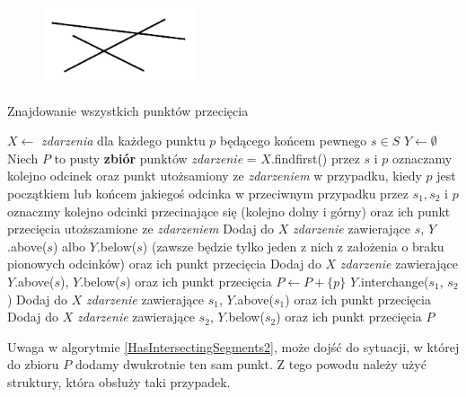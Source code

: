 \begin{figure}[H]
	\centering
	\includegraphics[width=0.4\textwidth]{data/zamiatanie_wariant2_kontrprzyklad.png}
	\caption{  }
	\label{fig:zamiatanie_kontrprzyklad_wariant2}
\end{figure}

\begin{algorithm}[H]
	\caption{Znajdowanie wszystkich punktów przecięcia}
	\begin{algorithmic}[1]
		\State $X \gets$ \textit{zdarzenia} dla każdego punktu $p$ będącego
		końcem pewnego $s \in S$
		\State $Y \gets \emptyset$
		\State Niech $P$ to pusty \textbf{zbiór} punktów
		\State \textit{zdarzenie} = $X.$findfirst()
		\State przez $s$ i $p$ oznaczamy
		kolejno odcinek oraz punkt utożsamiony ze \textit{zdarzeniem} w przypadku,
		kiedy $p$ jest początkiem lub końcem jakiegoś odcinka
		\State w przeciwnym przypadku przez $s_1, s_2$ i $p$ oznaczmy kolejno odcinki przecinające się (kolejno dolny i górny)
		oraz ich punkt przecięcia utoższamione ze \textit{zdarzeniem}
		\State Dodaj do $X$ \textit{zdarzenie} zawierające $s$, $Y$.above($s$)
		albo $Y$.below($s$) (zawsze będzie tylko jeden z nich z założenia o braku pionowych odcinków) oraz ich punkt przecięcia
		\EndIf
		\State Dodaj do $X$ \textit{zdarzenie} zawierające $Y$.above($s$), $Y$.below($s$) oraz ich punkt przecięcia  
		\EndIf
		\Else
		\State $P \gets P + \{p\}$
		\State $Y$.interchange($s_1$, $s_2$)
		\State Dodaj do $X$ \textit{zdarzenie} zawierające $s_1$, $Y$.above($s_1$) oraz ich punkt przecięcia
		\EndIf
		\State Dodaj do $X$ \textit{zdarzenie} zawierające $s_2$, $Y$.below($s_2$) oraz ich punkt przecięcia
		\EndIf
		\EndIf
		\EndWhile
		\State \Return $P$
		\EndProcedure
	\end{algorithmic}
	\label{HasIntersectingSegments2}
\end{algorithm}

Uwaga w algorytmie \ref{HasIntersectingSegments2}, może dojść do sytuacji, w której
do zbioru $P$ dodamy dwukrotnie ten sam punkt. Z tego powodu należy użyć 
struktury, która obsłuży taki przypadek.

\subsection{}

